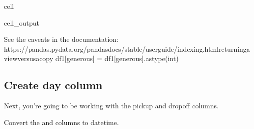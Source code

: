 \documentclass[letterpaper,10pt,english]{sphinxmanual}
\begin{document}
\begin{sphinxuseclass}{cell}
\begin{sphinxuseclass}{cell_output}
\begin{sphinxVerbatim}[commandchars=\\\{\}]
See the caveats in the documentation: https://pandas.pydata.org/pandas\PYGZhy{}docs/stable/user\PYGZus{}guide/indexing.html\PYGZsh{}returning\PYGZhy{}a\PYGZhy{}view\PYGZhy{}versus\PYGZhy{}a\PYGZhy{}copy
  df1[\PYGZsq{}generous\PYGZsq{}] = df1[\PYGZsq{}generous\PYGZsq{}].astype(int)
\end{sphinxVerbatim}

\end{sphinxuseclass}
\end{sphinxuseclass}

\subsection{Create day column}
\label{\detokenize{Automatidata_Machine Learning:create-day-column}}
\sphinxAtStartPar
Next, you’re going to be working with the pickup and dropoff columns.

\sphinxAtStartPar
Convert the  and  columns to datetime.
\end{document}
